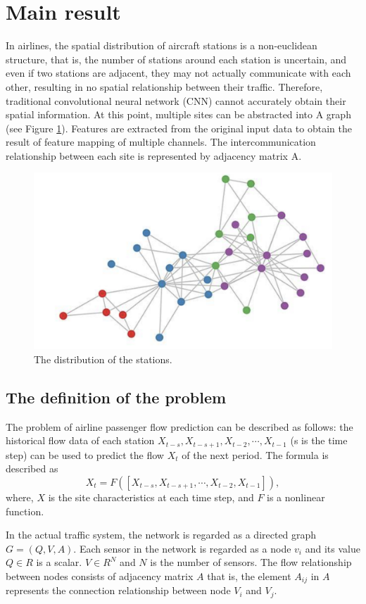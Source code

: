 \documentclass[journal,article,submit,moreauthors,pdftex]{Definitions/mdpi}
\begin{document}
\section{Main result}\label{sec:2}
In airlines, the spatial distribution of aircraft stations is a non-euclidean structure, that is, the number of stations around each station is uncertain, and even if two stations are adjacent, they may not actually communicate with each other, resulting in no spatial relationship between their traffic. Therefore, traditional convolutional neural network (CNN) cannot accurately obtain their spatial information. At this point, multiple sites can be abstracted into A graph (see Figure \ref{fig:stations}). Features are extracted from the original input data to obtain the result of feature mapping of multiple channels. The intercommunication relationship between each site is represented by adjacency matrix A.
\begin{figure}[htp]
    \centering
    \includegraphics[width=8 cm]{imgs/GCN.png}
    \caption{The distribution of the stations.}
    \label{fig:stations}
\end{figure}
\subsection{The definition of the problem} 
The problem of airline passenger flow prediction can be described as follows: the historical flow data of each station $X_{t-s}, X_{t-s+1},  X_{t-2}, \cdots,  X_{t-1}$ (s is the time step) can be used to predict the flow $X_{t}$ of the next period. 
The formula is described as
\begin{equation}
    X_{t} = F([ X_{t-s}, X_{t-s+1}, \cdots, X_{t-2}, X_{t-1}]),
\end{equation}
where, $X$ is the site characteristics at each time step, and $F$ is a nonlinear function.
\par In the actual traffic system, the network is regarded as a directed graph $G = (Q, V, A)$. Each sensor in the  network is regarded as a node $v_{i}$ and its value $Q \in R$ is a scalar. $V \in R^{N}$ and $N$ is the number of sensors. 
The flow relationship between nodes consists of adjacency matrix $A$ that is, the element $A_{ij}$ in $A$ represents the connection relationship between node $V_{i}$ and $V_{j}$.
\end{document}

